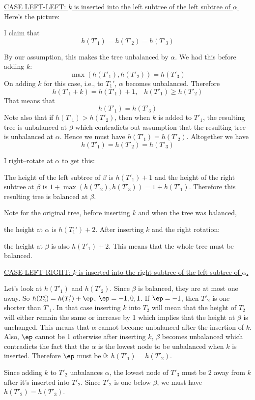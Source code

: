 \underline{CASE LEFT-LEFT: $k$ is inserted into the 
left subtree of the left subtree of $\alpha$.}
Here's the picture:

I claim that
\[
h(T'_1) = h(T'_2) = h(T'_3) 
\]


By our assumption, this makes the tree unbalanced by $\alpha$.
We had this before adding $k$:
\[
\max(h(T'_1), h(T'_2)) = h(T'_3)
\]
On adding $k$ for this case, i.e., to $T_1'$, 
$\alpha$ becomes unbalanced.
Therefore
\[
h(T'_1 + k) = h(T'_1) + 1,
\,\,\,\,\,
h(T'_1) \geq h(T'_2)
\]
That means that 
\[
h(T'_1) = h(T'_3)
\]
Note also that if $h(T'_1) > h(T'_2)$,
then when $k$ is added to $T'_1$, the resulting
tree is unbalanced at $\beta$
which contradicts out assumption that 
the resulting tree is unbalanced at $\alpha$.
Hence we must have $h(T'_1) = h(T'_2)$.
Altogether we have 
\[
h(T'_1) = h(T'_2) = h(T'_3)
\] 

I right--rotate at $\alpha$ to get this:

The height of the left subtree of $\beta$ is $h(T'_1) + 1$
and the height of the right subtree at 
$\beta$ is $1 + \max(h(T'_2), h(T'_3)) = 1 + h(T'_1)$.
Therefore this resulting tree is balanced at $\beta$.

Note for the original tree, before inserting $k$
and when the tree was balanced,

the height at $\alpha$ is $h(T_1') + 2$.
After inserting $k$ and the right rotation:

the height at $\beta$ is also $h(T'_1)+2$.
This means that the whole tree must be balanced.



\underline{CASE LEFT-RIGHT: $k$ is inserted into the 
  right subtree of the left subtree of $\alpha$.}

Let's look at $h(T'_1)$ and $h(T'_2)$.
Since $\beta$ is balanced, they are at most one away.
So $h(T'_2) = h(T'_1) + \ep$, $\ep = -1, 0, 1$.
If $\ep = -1$, then $T'_2$ is one shorter than
$T'_1$. In that case inserting $k$ into $T_2$
will mean that the height of $T_2$ will either
remain the same or increase by 1
which implies that the height at $\beta$
is unchanged.
This means that $\alpha$ cannot become unbalanced
after the insertion of $k$.
Also, $\ep$ cannot be 1 otherwise
after inserting $k$, $\beta$ becomes unbalanced
which contradicts the fact that the $\alpha$
is the lowest node to be unbalanced when $k$ is inserted.
Therefore $\ep$ must be $0$:
$h(T'_1) = h(T'_2)$.

Since adding $k$ to $T'_2$ unbalances $\alpha$, 
the lowest node of $T'_3$ must be 2 away from $k$ after it's inserted into 
$T'_2$.
Since $T'_2$ is one below $\beta$,
we must have $h(T'_2) = h(T'_3)$.

